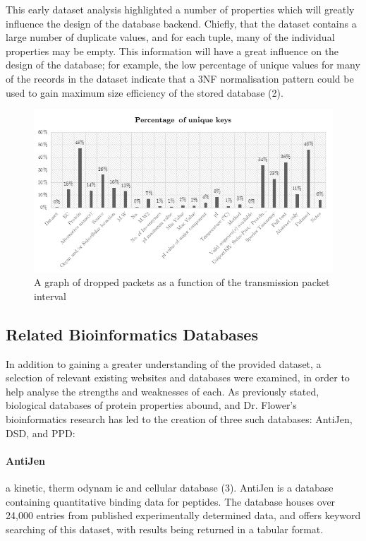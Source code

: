 \documentclass[12pt,a4paper]{article}
\begin{document}
This early dataset analysis highlighted a number of properties which will
greatly influence the design of the database backend. Chiefly, that the dataset
contains a large number of duplicate values, and for each tuple, many of the
individual properties may be empty. This information will have a great influence
on the design of the database; for example, the low percentage of unique values
for many of the records in the dataset indicate that a 3NF normalisation pattern
could be used to gain maximum size efficiency of the stored database (2).

\begin{figure}[H]
\centering
\includegraphics{assets/chart-dataset-unique.png}
\caption{A graph of dropped packets as a function of the transmission packet
  interval}
\label{fig:graph-interval-dropped}
\end{figure}

\newpage
\subsection{Related Bioinformatics Databases}
In addition to gaining a greater understanding of the provided dataset, a
selection of relevant existing websites and databases were examined, in order to
help analyse the strengths and weaknesses of each. As previously stated,
biological databases of protein properties abound, and Dr. Flower’s
bioinformatics research has led to the creation of three such databases:
AntiJen, DSD, and PPD:

\paragraph{AntiJen} a kinetic, therm odynam ic and cellular database
(3). AntiJen is a database containing quantitative binding data for
peptides. The database houses over 24,000 entries from published experimentally
determined data, and offers keyword searching of this dataset, with results
being returned in a tabular format.
\end{document}
